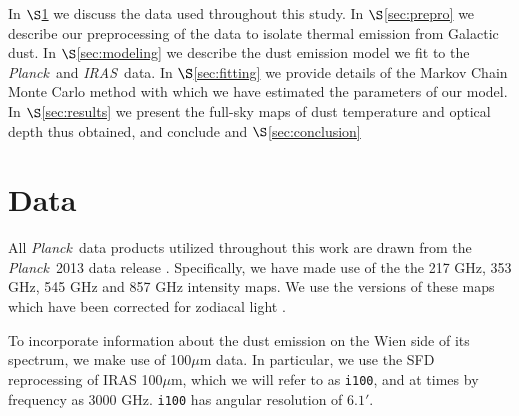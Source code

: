 \documentclass{emulateapj}
\newcommand{\IRAS}{{\it IRAS}}
\newcommand{\PLANCK}{{\it Planck}}
\begin{document}

In $\S$\ref{sec:data} we discuss the data used throughout this study. In 
$\S$\ref{sec:prepro} we describe our preprocessing of the data to isolate 
thermal emission from Galactic dust. In $\S$\ref{sec:modeling} we describe the 
dust emission model we fit to the \PLANCK~and \IRAS~data. In 
$\S$\ref{sec:fitting} we provide details of the Markov Chain Monte Carlo method
with which we have estimated the parameters of our model. In 
$\S$\ref{sec:results} we present the full-sky maps of dust temperature and 
optical depth thus obtained, and conclude and $\S$\ref{sec:conclusion}




\section{Data}
\label{sec:data}
All \PLANCK~data products utilized throughout this work are drawn from the 
\PLANCK~2013 data release \citep{planck2013}. Specifically, we have made use 
of the the 217 GHz, 353 GHz, 545 GHz and 857 GHz intensity maps. We use the 
versions of these maps which have been corrected for zodiacal light 
\citep[\texttt{R1.10\_nominal\_ZodiCorrected},][]{planckzodi}.


To incorporate information about the dust emission on the Wien side of its 
spectrum, we make use of 100$\mu$m data. In particular, we use the SFD 
reprocessing of IRAS 100$\mu$m, which we will refer to as \verb|i100|, and at 
times by frequency as 3000 GHz. \verb|i100| has angular resolution of $6.1'$. 
\end{document}

